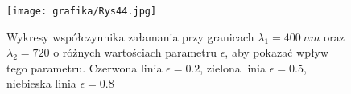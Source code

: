 \begin{figure}[hbt]
    \centering
    \texttt{[image: grafika/Rys44.jpg]}
    \caption{Wykresy współczynnika załamania przy granicach $\lambda_1=400~nm$ oraz $\lambda_2=720$ o różnych wartościach parametru $\epsilon$, aby pokazać wpływ tego parametru. Czerwona linia $\epsilon=0.2$, zielona linia $\epsilon=0.5$, niebieska linia $\epsilon=0.8$}
\end{figure}

\newpage

